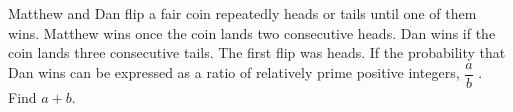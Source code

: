 Matthew and Dan flip a fair coin repeatedly heads or tails until one of them wins. Matthew wins once the coin lands two consecutive heads. Dan wins if the coin lands three consecutive tails. The first flip was heads. If the probability that Dan wins can be expressed as a ratio of relatively prime positive integers,  $\dfrac{a}{b}$ . Find $a + b$.
